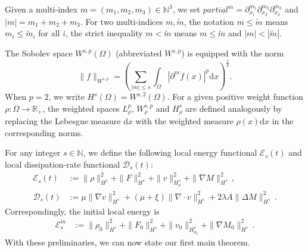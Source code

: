 \documentclass[reqno,11pt]{amsart}
\numberwithin{equation}{section}
\def\d{\mathrm{d}}
\def\R{\mathbb{R}}
\begin{document}
Given a multi-index $ m=(m_{1},m_{2}, m_{3})\in\mathbb{N}^{3} $, we set $ partial^{m}=\partial_{x_{1}}^{m_{1}}\partial_{x_{2}}^{m_{2}} \partial_{x_{3}}^{m_{3}} $ and $|m|=m_{1}+m_{2}+ m_{3}$. For two multi-indices $m, \widetilde{m}$, the notation $ m \leq \widetilde{m} $ means $m_i \leq \widetilde{m}_i$ for all $i$, the strict inequality $ m<\widetilde{m} $ means $ m\leq\widetilde{m} $ and $ |m|<|\widetilde{m}| $. 

The Sobolev space $ W^{s,p}(\Omega) $ (abbreviated $W^{s,p}$) is equipped with the norm
$$ \|f\|_{W^{s,p}}=\left(\sum_{|m|\leq s}\int_{\Omega}|\partial^{m}f(x)|^{p}\mathrm{d}x\right)^{\frac{1}{p}}. $$
When $ p=2 $, we write $ H^{s}(\Omega) =W^{s,2} (\Omega) $. For a given positive weight function $\rho: \Omega \to \R_+$, the weighted spaces $L^p_\rho$, $W^{s,p}_\rho$ and $H^s_\rho$ are defined analogously by replacing the Lebesgue measure $\d x$ with the weighted measure $\rho (x) \d x$ in the corresponding norms. 

For any integer $s \in \mathbb{N}$, we define the following local energy functional $\mathcal{E}_s (t)$ and local dissipation-rate functional $\mathcal{D}_s (t)$:
\begin{equation}\label{EDs-loc}
	\begin{aligned}
		\mathcal{E}_s (t) & := \| \rho \|^2_{H^s} +  \| F \|^2_{H^s} + \| v \|^2_{H^s_\rho} +\|\nabla M\|^2_{H^s}\,, \\
		\mathcal{D}_s (t) & := \mu \| \nabla v \|^2_{H^s} + (\mu+\xi)\|\nabla\cdot v\| ^{2}_{H^{s}}+2\lambda A\|\Delta M\|^2_{H^s}  \,.
	\end{aligned}
\end{equation}
Correspondingly, the initial local energy is
\begin{equation}\label{E_s-in}
	\begin{aligned}
		\mathcal{E}_s^{in} & := \| \rho_0 \|^2_{H^s} +  \| F_0 \|^2_{H^s} + \| v_0 \|^2_{H^s_{\rho_0}} +\|\nabla M_0 \|^2_{H^s} \,.
	\end{aligned}
\end{equation}
With these preliminaries, we can now state our first main theorem.
\end{document}
